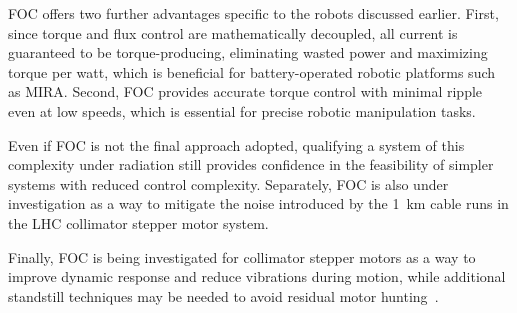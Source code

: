 FOC offers two further advantages specific to the robots discussed earlier. First, since torque and flux control are mathematically decoupled, all current is guaranteed to be torque-pro\-ducing, eliminating wasted power and maximizing torque per watt, which is beneficial for battery-operated robotic platforms such as MIRA. Second, FOC provides accurate torque control with minimal ripple even at low speeds, which is essential for precise robotic manipulation tasks.

Even if FOC is not the final approach adopted, qualifying a system of this complexity under radiation still provides confidence in the feasibility of simpler systems with reduced control complexity. Separately, FOC is also under investigation as a way to mitigate the noise introduced by the 1~km cable runs in the LHC collimator stepper motor system.

Finally, FOC is being investigated for collimator stepper motors as a way to improve dynamic response and reduce vibrations during motion, while additional standstill techniques may be needed to avoid residual motor hunting~\cite{merino2019vibration}.
